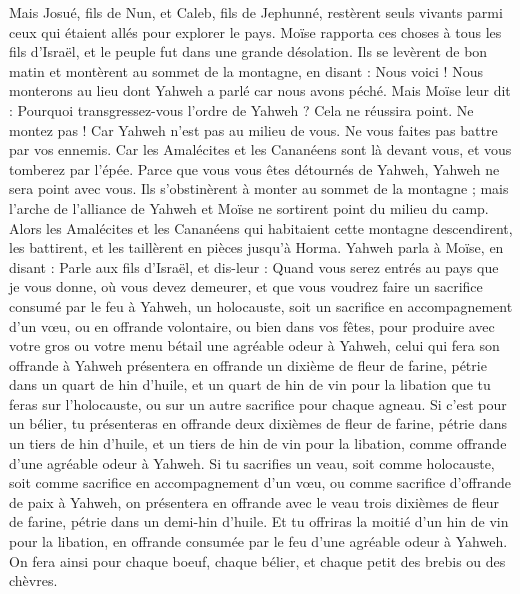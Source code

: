 \begin{multicols}{2}
Mais Josué, fils de Nun, et Caleb, fils de Jephunné, restèrent seuls vivants parmi ceux qui étaient allés pour explorer le pays.
Moïse rapporta ces choses à tous les fils d'Israël, et le peuple fut dans une grande désolation.
Ils se levèrent de bon matin et montèrent au sommet de la montagne, en disant : Nous voici ! Nous monterons au lieu dont Yahweh a parlé car nous avons péché.
Mais Moïse leur dit : Pourquoi transgressez-vous l’ordre de Yahweh ? Cela ne réussira point.
Ne montez pas ! Car Yahweh n'est pas au milieu de vous. Ne vous faites pas battre par vos ennemis.
Car les Amalécites et les Cananéens sont là devant vous, et vous tomberez par l'épée. Parce que vous vous êtes détournés de Yahweh, Yahweh ne sera point avec vous.
Ils s'obstinèrent à monter au sommet de la montagne ; mais l'arche de l'alliance de Yahweh et Moïse ne sortirent point du milieu du camp.
Alors les Amalécites et les Cananéens qui habitaient cette montagne descendirent, les battirent, et les taillèrent en pièces jusqu'à Horma.
\VerseOne{}Yahweh parla à Moïse, en disant :
Parle aux fils d'Israël, et dis-leur : Quand vous serez entrés au pays que je vous donne, où vous devez demeurer,
et que vous voudrez faire un sacrifice consumé par le feu à Yahweh, un holocauste, soit un sacrifice en accompagnement d’un vœu, ou en offrande volontaire, ou bien dans vos fêtes, pour produire avec votre gros ou votre menu bétail une agréable odeur à Yahweh,
celui qui fera son offrande à Yahweh présentera en offrande un dixième de fleur de farine, pétrie dans un quart de hin d'huile,
et un quart de hin de vin pour la libation que tu feras sur l'holocauste, ou sur un autre sacrifice pour chaque agneau.
Si c'est pour un bélier, tu présenteras en offrande deux dixièmes de fleur de farine, pétrie dans un tiers de hin d'huile,
et un tiers de hin de vin pour la libation, comme offrande d’une agréable odeur à Yahweh.
Si tu sacrifies un veau, soit comme holocauste, soit comme sacrifice en accompagnement d’un vœu, ou comme sacrifice d’offrande de paix à Yahweh,
on présentera en offrande avec le veau trois dixièmes de fleur de farine, pétrie dans un demi-hin d'huile.
Et tu offriras la moitié d'un hin de vin pour la libation, en offrande consumée par le feu d’une agréable odeur à Yahweh.
On fera ainsi pour chaque boeuf, chaque bélier, et chaque petit des brebis ou des chèvres.

\end{multicols}
